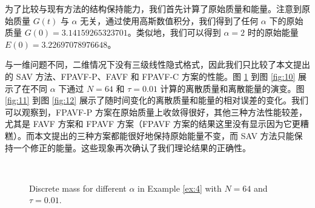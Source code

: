 	为了比较与现有方法的结构保持能力，我们首先计算了原始质量和能量。注意到原始质量 $G(t)$ 与 $\alpha$ 无关，通过使用高斯数值积分，我们得到了任何 $\alpha$ 下的原始质量 $G(0)=3.14159265323701$。类似地，我们可以得到 $\alpha=2$ 时的原始能量 $E(0)=3.22697078976648$。

与一维问题不同，二维情况下没有三级线性隐式格式，因此我们只比较了本文提出的 SAV 方法、FPAVF-P、FAVF 和 FPAVF-C 方案的性能。图 \ref{fig:9} 到图 \ref{fig:10} 展示了在不同 $\alpha$ 下通过 $N=64$ 和 $\tau=0.01$ 计算的离散质量和离散能量的演变。图 \ref{fig:11} 到图 \ref{fig:12} 展示了随时间变化的离散质量和能量的相对误差的变化。我们可以观察到，FPAVF-P 方案在原始质量上收敛得很好，其他三种方法性能较差，尤其是 FAVF 方案和 FPAVF 方案（FPAVF 方案的结果这里没有显示因为它更糟糕）。而本文提出的三种方案都能很好地保持原始能量不变，而 SAV 方法只能保持一个修正的能量。这些现象再次确认了我们理论结果的正确性。


\begin{figure}[H]
	\begin{center}
	 \\
	 \caption{Discrete mass for different $\alpha$ in Example \ref{ex:4} with $N = 64$ and $\tau=0.01$.} \label{fig:9}
	\end{center}
	\end{figure}

